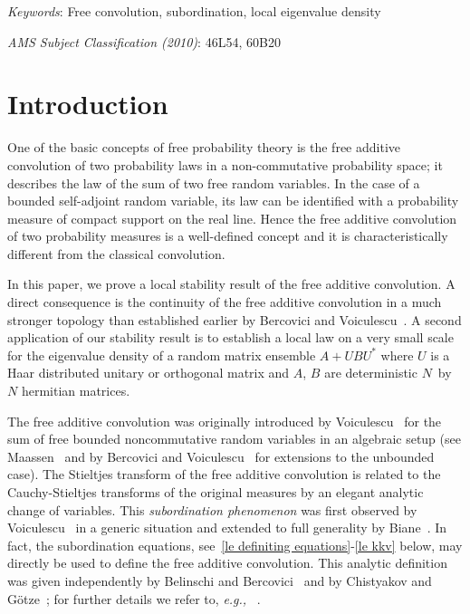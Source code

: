 \documentclass[10pt,reqno]{amsart}
\numberwithin{equation}{section}
\theoremstyle{plain}
\numberwithin{kevin}{section}
\theoremstyle{remark}
\newcommand{\eg}{\emph{e.g., }}
\begin{document}
 \vspace{2mm}
 
 {\small


 \footnotesize{\noindent\textit{Keywords}: Free convolution, subordination, local eigenvalue density}
 
 \footnotesize{\noindent\textit{AMS Subject Classification (2010)}: 46L54, 60B20}
 \vspace{2mm}

 }


\thispagestyle{headings}


\section{Introduction}

One of the basic concepts of free probability theory is the free additive convolution of two
probability laws in a non-commutative probability space; it describes the law of the sum of
two free random variables. In the case of a bounded self-adjoint random variable, its law can be identified 
with a probability measure of compact support on the real line. Hence the
free additive convolution of two probability measures is a well-defined concept and it is characteristically different from the classical convolution. 

In this paper, we prove a local stability result of the free additive convolution. A direct consequence
 is the continuity of the free additive convolution in a much stronger topology 
than established earlier by  Bercovici and Voiculescu~\cite{BeV93}.
A second application of our stability result is  to establish a local law on a very small scale for the eigenvalue
density of a random matrix ensemble $A+UBU^*$ where $U$ is a Haar distributed unitary or orthogonal matrix
and $A$, $B$ are deterministic $N$~by~$N$ hermitian matrices.



The free additive convolution was originally introduced by Voiculescu~\cite{Voi86} for the sum of free bounded 
noncommutative random variables in an algebraic setup (see  
 Maassen~\cite{Maa92} and by Bercovici and Voiculescu~\cite{BeV93}
for extensions to the unbounded case).
The Stieltjes transform of the free additive convolution is related 
to the Cauchy-Stieltjes transforms of the original measures by an elegant analytic change of variables.
 This {\it subordination phenomenon}
was first  observed by Voiculescu~\cite{Voi93} in a generic situation
and extended to full generality by Biane~\cite{Bia98}. In fact, the subordination equations,
see~\eqref{le definiting equations}-\eqref{le kkv} below, may directly be used to define
the free additive convolution. This analytic definition was given independently by Belinschi and Bercovici~\cite{BB} and by
Chistyakov and G\"{o}tze~\cite{CG}; for further details we refer to, \eg~\cite{VDN,HP,AGZ}.
\end{document}
